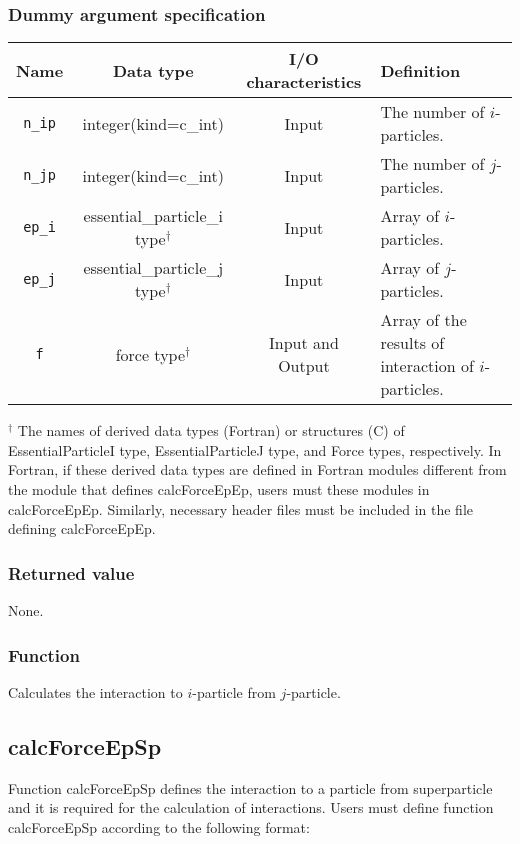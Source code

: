 \subsubsection*{Dummy argument specification}
\begin{table}[H]
\begin{tabularx}{\linewidth}{cccX}
\toprule
\rowcolor{Snow2}
Name & Data type & I/O characteristics & Definition \\
\midrule
\texttt{n\_ip} & integer(kind=c\_int) & Input & The number of $i$-particles. \\
\texttt{n\_jp} & integer(kind=c\_int) & Input & The number of $j$-particles. \\
\texttt{ep\_i} & essential\_particle\_i type$^{\dagger}$ & Input & Array of $i$-particles. \\
\texttt{ep\_j} & essential\_particle\_j type$^{\dagger}$ & Input & Array of $j$-particles. \\
\texttt{f} & force type$^{\dagger}$ & Input and Output & Array of the results of interaction of $i$-particles. \\
\bottomrule
\end{tabularx}
\begin{flushleft}
$^{\dagger}$ The names of derived data types {\small (Fortran)} or structures {\small (C)} of EssentialParticleI type, EssentialParticleJ type, and Force types, respectively. In Fortran, if these derived data types are defined in Fortran modules different from the module that defines calcForceEpEp, users must  these modules in calcForceEpEp. Similarly, necessary header files must be included in the file defining calcForceEpEp.
\end{flushleft}
\end{table}


\subsubsection*{Returned value}
None.

\subsubsection*{Function}
Calculates the interaction to $i$-particle from $j$-particle.


\subsection{calcForceEpSp}
\label{subsec:calcForceEpSP}
Function calcForceEpSp defines the interaction to a particle from superparticle and it is required for the calculation of interactions. Users must define function calcForceEpSp according to the following format:

